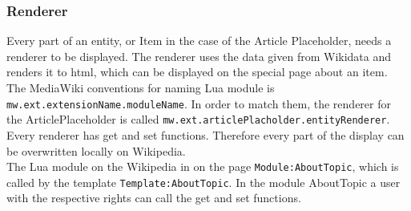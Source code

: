 \subsubsection{Renderer}

Every part of an entity, or Item in the case of the Article Placeholder, needs a renderer to be displayed. The renderer uses the data given from Wikidata and renders it to html, which can be displayed on the special page about an item. \\
The MediaWiki conventions for naming Lua module is \texttt{mw.ext.extensionName.moduleName}. In order to match them, the renderer for the ArticlePlaceholder is called \texttt{mw.ext.articlePlacholder.entityRenderer}. \\
Every renderer has get and set functions. Therefore every part of the display can be overwritten locally on Wikipedia. \\
The Lua module on the Wikipedia in on the page \texttt{Module:AboutTopic}, which is called by the template \texttt{Template:AboutTopic}. In the module AboutTopic a user with the respective rights can call the get and set functions. \\

